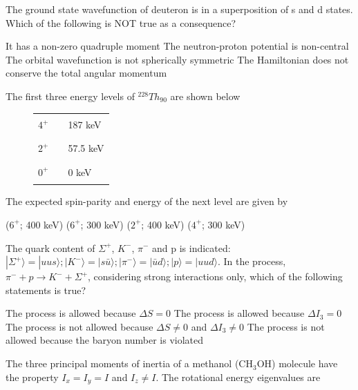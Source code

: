 \documentclass{exam}
\begin{document}
\begin{questions}
\question The ground state wavefunction of deuteron is in a superposition of s and d states. Which of the following is NOT true as a consequence?\hfill{}

\begin{choices}
	\choice It has a non-zero quadruple moment \choice The neutron-proton potential is non-central
	\choice The orbital wavefunction is not spherically symmetric \choice The Hamiltonian does not conserve the total angular momentum
\end{choices}

\question The first three energy levels of ${}^{228}Th_{90}$ are shown below
	\begin{figure}[H] \centering
	\begin{tabular}{r c l}
		$4^+$ & \rule{3cm}{0.4pt} & 187 keV \\
		$2^+$ & \rule{3cm}{0.4pt} & 57.5 keV \\
		$0^+$ & \rule{3cm}{0.4pt} & 0 keV \\
	\end{tabular}
	\end{figure}
The expected spin-parity and energy of the next level are given by\hfill{}

\begin{oneparchoices}
	\choice ($6^+$; 400 keV) \choice ($6^+$; 300 keV) \choice ($2^+$; 400 keV) \choice ($4^+$; 300 keV)
\end{oneparchoices}

\question The quark content of $\Sigma^{+}$, $K^{-}$, $\pi^{-}$ and p is indicated: $|\Sigma^{+}\rangle=|uus\rangle; |K^{-}\rangle=|s\bar{u}\rangle; |\pi^{-}\rangle=|\bar{u}d\rangle; |p\rangle=|uud\rangle$. In the process, $\pi^{-} + p \rightarrow K^{-} + \Sigma^{+}$, considering strong interactions only, which of the following statements is true?\hfill{}

\begin{choices}
	\choice The process is allowed because $\Delta S = 0$
	\choice The process is allowed because $\Delta I_3 = 0$
	\choice The process is not allowed because $\Delta S \neq 0$ and $\Delta I_3 \neq 0$
	\choice The process is not allowed because the baryon number is violated
\end{choices}

\question The three principal moments of inertia of a methanol (CH$_3$OH) molecule have the property $I_x = I_y = I$ and $I_z \neq I$. The rotational energy eigenvalues are\hfill{}


\end{questions}
\end{document}
